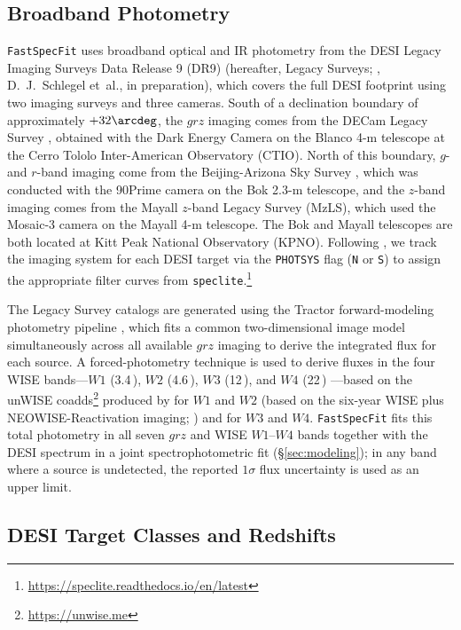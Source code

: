 \documentclass[modern,linenumbers]{aastex702}
\newcommand{\fastspecfit}{\texttt{FastSpecFit}}
\begin{document}
\subsection{Broadband Photometry}
\label{ssec:photometry}

\fastspecfit{} uses broadband optical and IR photometry from the DESI
Legacy Imaging Surveys Data Release 9 (DR9) (hereafter, Legacy
Surveys; \citealt{dey19a}, D.~J.~Schlegel et~al., in preparation),
which covers the full DESI footprint using two imaging surveys and
three cameras. South of a declination boundary of approximately
$+32\arcdeg$, the $grz$ imaging comes from the DECam Legacy Survey
\citep[DECaLS;][]{dey19a}, obtained with the Dark Energy Camera
\citep[DECam;][]{flaugher15a} on the Blanco 4-m telescope at the Cerro
Tololo Inter-American Observatory (CTIO).  North of this boundary,
$g$- and $r$-band imaging come from the Beijing-Arizona Sky Survey
\citep[BASS;][]{zou17a}, which was conducted with the 90Prime camera
\citep{williams04a} on the Bok 2.3-m telescope, and the $z$-band
imaging comes from the Mayall $z$-band Legacy Survey (MzLS), which
used the Mosaic-3 camera \citep{dey16a} on the Mayall 4-m
telescope. The Bok and Mayall telescopes are both located at Kitt Peak
National Observatory (KPNO). Following \citet{myers23a}, we track the
imaging system for each DESI target via the \texttt{PHOTSYS} flag
(\texttt{N} or \texttt{S}) to assign the appropriate filter
curves from
  \texttt{speclite}.\footnote{\url{https://speclite.readthedocs.io/en/latest}}

The Legacy Survey catalogs are generated using the Tractor
forward-modeling photometry pipeline \citep{lang16b, lang16a}, which
fits a common two-dimensional image model simultaneously across all
available $grz$ imaging to derive the integrated flux for each
source. A forced-photometry technique is used to derive fluxes in the
four WISE bands---$W1$ (3.4\,\micron), $W2$ (4.6\,\micron), $W3$
(12\,\micron), and $W4$ (22\,\micron) \citep{wright10a}---based on the
unWISE coadds\footnote{\url{https://unwise.me}} produced by
\citet{meisner21a} for $W1$ and $W2$ (based on the six-year WISE plus
NEOWISE-Reactivation imaging; \citealt{mainzer14a}) and
\citet{lang14a} for $W3$ and $W4$. \fastspecfit{} fits this total
photometry in all seven $grz$ and WISE $W1$--$W4$ bands together
with the DESI spectrum in a joint spectrophotometric fit
(\S\ref{sec:modeling}); in any band where a source is undetected, the
reported $1\sigma$ flux uncertainty is used as an upper limit.

\subsection{DESI Target Classes and Redshifts}
\label{ssec:targets}
\end{document}
